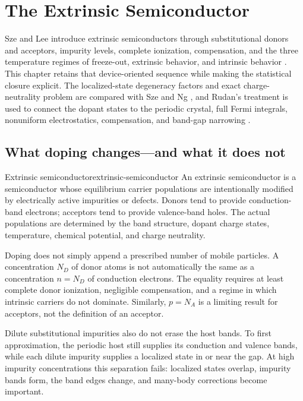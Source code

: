 \chapter{The Extrinsic Semiconductor}
\label{ch:extrinsic-semiconductor}

Sze and Lee introduce extrinsic semiconductors through substitutional donors
and acceptors, impurity levels, complete ionization, compensation, and the three
temperature regimes of freeze-out, extrinsic behavior, and intrinsic behavior
\cite[Sec.~1.6]{szeLee2012}.  This chapter retains that device-oriented
sequence while making the statistical closure explicit.  The localized-state
degeneracy factors and exact charge-neutrality problem are compared with Sze
and Ng \cite[Secs.~1.4.2--1.4.3]{szeNg2007}, and Rudan's treatment is used to
connect the dopant states to the periodic crystal, full Fermi integrals,
nonuniform electrostatics, compensation, and band-gap narrowing
\cite[Secs.~18.4--18.6]{rudan2015}.

\section{What doping changes---and what it does not}

\begin{definition}{Extrinsic semiconductor}{extrinsic-semiconductor}
An extrinsic semiconductor is a semiconductor whose equilibrium carrier
populations are intentionally modified by electrically active impurities or
defects.  Donors tend to provide conduction-band electrons; acceptors tend to
provide valence-band holes.  The actual populations are determined by the
band structure, dopant charge states, temperature, chemical potential, and
charge neutrality.
\end{definition}

Doping does not simply append a prescribed number of mobile particles.  A
concentration $N_D$ of donor atoms is not automatically the same as a
concentration $n=N_D$ of conduction electrons.  The equality requires at least
complete donor ionization, negligible compensation, and a regime in which
intrinsic carriers do not dominate.  Similarly, $p=N_A$ is a limiting result
for acceptors, not the definition of an acceptor.

Dilute substitutional impurities also do not erase the host bands.  To first
approximation, the periodic host still supplies its conduction and valence
bands, while each dilute impurity supplies a localized state in or near the
gap.  At high impurity concentrations this separation fails: localized states
overlap, impurity bands form, the band edges change, and many-body corrections
become important.

